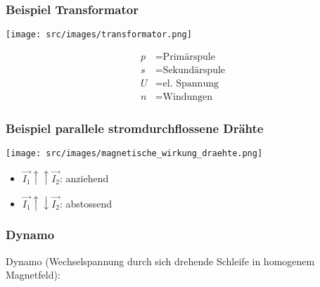     \subsubsection{Beispiel Transformator}
        \begin{minipage}{0.49\linewidth}
            \texttt{[image: src/images/transformator.png]}
        \end{minipage}
        \begin{minipage}{0.49\linewidth}
            \begin{scriptsize}
                \begin{align*}
                    p &= \text{Primärspule}\\
                    s &= \text{Sekundärspule}\\
                    U &= \text{el. Spannung}\\
                    n &= \text{Windungen}
                \end{align*}
            \end{scriptsize}
        \end{minipage}
%
    \subsubsection{Beispiel parallele stromdurchflossene Drähte}
        \begin{minipage}{0.49\linewidth}
            \texttt{[image: src/images/magnetische\_wirkung\_draehte.png]}
        \end{minipage}
        \begin{minipage}{0.49\linewidth}
            \begin{itemize}
                \item $\vec{I_1} \uparrow \uparrow \vec{I_2}$: anziehend
                \item $\vec{I_1} \uparrow \downarrow \vec{I_2}$: abstossend
            \end{itemize}
        \end{minipage}

    \subsubsection{Dynamo}
        Dynamo (Wechselspannung durch sich drehende Schleife in homogenem Magnetfeld):
